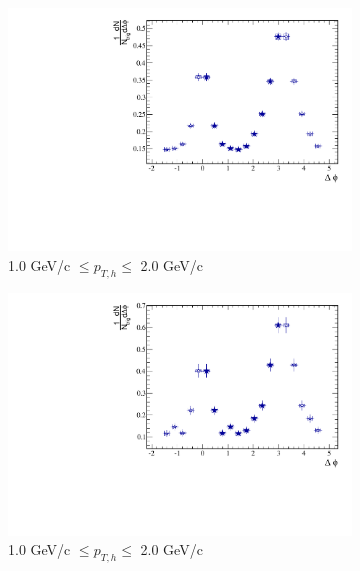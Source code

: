 \begin{figure}[htbp]
\begin{subfigure}{0.5\textwidth}
		\includegraphics[width=\textwidth]{Plots/Correlations/pp/pp_NPE_h_corr_primpt_4_5_assopt_2_2.pdf}
		\caption{1.0 GeV/c $\leq p_{T,h} \leq$ 2.0 GeV/c}
		\label{fig:ppcorrc}
	\end{subfigure}	
	\begin{subfigure}{0.5\textwidth}
		\includegraphics[width=\textwidth]{Plots/Correlations/pp/pp_NPE_h_corr_primpt_6_8_assopt_2_2.pdf}
		\caption{1.0 GeV/c $\leq p_{T,h} \leq$ 2.0 GeV/c}
		\label{fig:ppcorrd}
	\end{subfigure}	
	\begin{subfigure}{0.5\textwidth}

\end{subfigure}
\end{figure}
